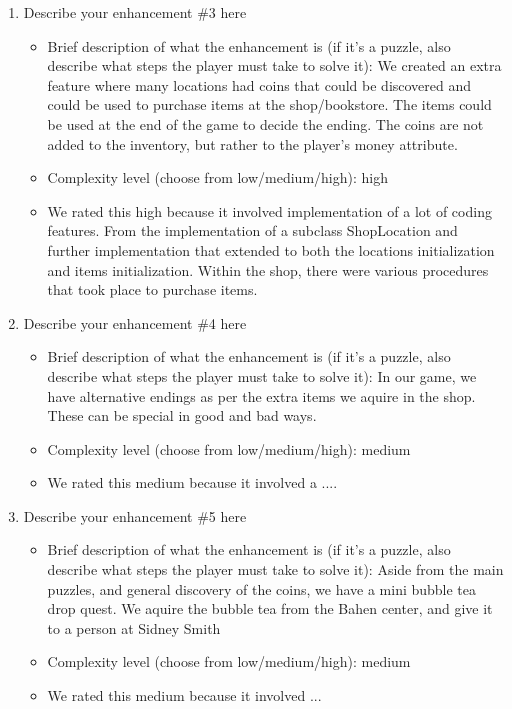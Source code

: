\documentclass[11pt]{article}
\begin{document}
\begin{enumerate}
\item Describe your enhancement \#3 here
	\begin{itemize}
	\item Brief description of what the enhancement is (if it's a puzzle, also describe what steps the player must take to solve it): We created an extra feature where many locations had coins that could be discovered and could be used to purchase items at the shop/bookstore. The items could be used at the end of the game to decide the ending. The coins are not added to the inventory, but rather to the player's money attribute. 
	\item Complexity level (choose from low/medium/high): high
	\item  We rated this high because it involved implementation of a lot of coding features. From the implementation of a subclass ShopLocation and further implementation that extended to both the locations initialization and items initialization. Within the shop, there were various procedures that took place to purchase items. 
	\end{itemize}
 
\item Describe your enhancement \#4 here
	\begin{itemize}
	\item Brief description of what the enhancement is (if it's a puzzle, also describe what steps the player must take to solve it): In our game, we have alternative endings as per the extra items we aquire in the shop. These can be special in good and bad ways. 
	\item Complexity level (choose from low/medium/high): medium
	\item  We rated this medium because it involved a ....
	\end{itemize}
 
\item Describe your enhancement \#5 here
	\begin{itemize}
	\item Brief description of what the enhancement is (if it's a puzzle, also describe what steps the player must take to solve it): Aside from the main puzzles, and general discovery of the coins, we have a mini bubble tea drop quest. We aquire the bubble tea from the Bahen center, and give it to a person at Sidney Smith
	\item Complexity level (choose from low/medium/high): medium
	\item  We rated this medium because it involved ...
	\end{itemize}
 


\end{enumerate}
\end{document}
